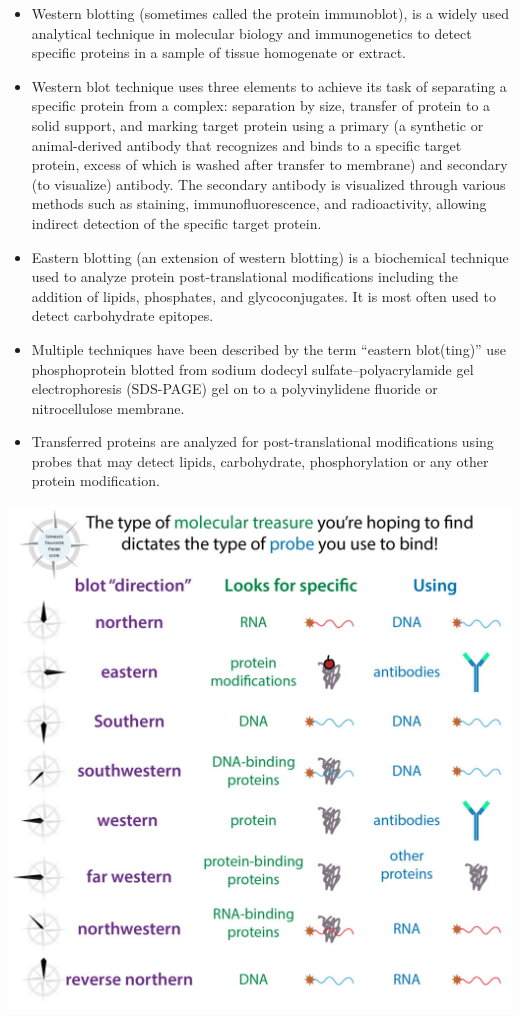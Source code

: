 \documentclass[11pt,dvipsnames,ignorenonframetext,aspectratio=169]{beamer}
\begin{document}
\begin{frame}{}
\protect\hypertarget{section-32}{}
\footnotesize

\begin{itemize}
\item
  Western blotting (sometimes called the protein immunoblot), is a
  widely used analytical technique in molecular biology and
  immunogenetics to detect specific proteins in a sample of tissue
  homogenate or extract.
\item
  Western blot technique uses three elements to achieve its task of
  separating a specific protein from a complex: separation by size,
  transfer of protein to a solid support, and marking target protein
  using a primary (a synthetic or animal-derived antibody that
  recognizes and binds to a specific target protein, excess of which is
  washed after transfer to membrane) and secondary (to visualize)
  antibody. The secondary antibody is visualized through various methods
  such as staining, immunofluorescence, and radioactivity, allowing
  indirect detection of the specific target protein.
\item
  Eastern blotting (an extension of western blotting) is a biochemical
  technique used to analyze protein post-translational modifications
  including the addition of lipids, phosphates, and glycoconjugates. It
  is most often used to detect carbohydrate epitopes.
\item
  Multiple techniques have been described by the term ``eastern
  blot(ting)'' use phosphoprotein blotted from sodium dodecyl
  sulfate--polyacrylamide gel electrophoresis (SDS-PAGE) gel on to a
  polyvinylidene fluoride or nitrocellulose membrane.
\item
  Transferred proteins are analyzed for post-translational modifications
  using probes that may detect lipids, carbohydrate, phosphorylation or
  any other protein modification.
\end{itemize}
\end{frame}

\begin{frame}{}
\protect\hypertarget{section-33}{}
\begin{center}\includegraphics[width=0.48\linewidth]{../images/blotting_compass} \end{center}
\end{frame}
\end{document}
